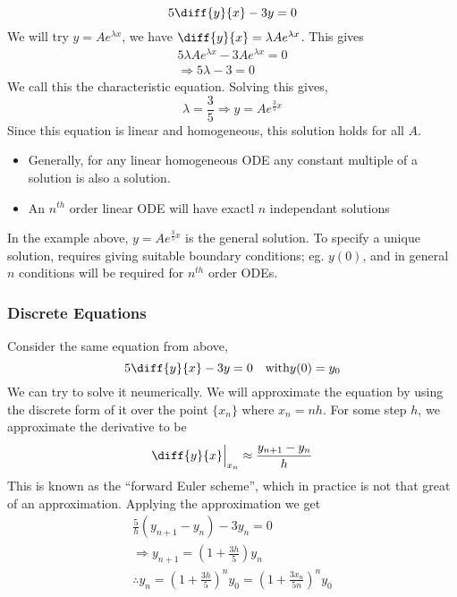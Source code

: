 \documentclass{article}
\begin{document}
\begin{eg}
    \[
        5 \diff{y}{x} - 3y = 0  
    \]
    We will try $y = Ae^{\lambda x}$, we have $\diff{y}{x} = \lambda A e^{\lambda x}$. This gives
    \begin{align*}
        5\lambda A e^{\lambda x} - 3Ae^{\lambda x} = 0 \\
        \Rightarrow 5\lambda - 3 = 0
    \end{align*}
    We call this the characteristic equation. Solving this gives,
    \[
        \lambda = \frac{3}{5} \Rightarrow y = Ae^{\frac{3}{5} x}   
    \]
    Since this equation is linear and homogeneous, this solution holds for all $A$.
\end{eg}

\begin{remark}\leavevmode
    \begin{itemize}
        \item Generally, for any linear homogeneous ODE any constant multiple of a solution is also a solution.
        \item An $n^{th}$ order linear ODE will have exactl $n$ independant solutions
    \end{itemize}
    In the example above, $y = Ae^{\frac{3}{5} x}$ is the general solution. To specify a unique solution, requires giving suitable boundary conditions; eg. $y(0)$, and in general $n$ conditions will be required for $n^{th}$ order ODEs.
\end{remark}

\subsubsection*{Discrete Equations}

Consider the same equation from above,
\[
    5 \diff{y}{x} - 3y = 0 \quad \text{with} y(0) = y_0
\]
We can try to solve it neumerically. We will approximate the equation by using the discrete form of it over the point $\{x_n\}$ where $x_n = nh$. For some step $h$, we approximate the derivative to be
\[
    \diff{y}{x}\Big{|}_{x_n} \approx \frac{y_{n+1} - y_n}{h}    
\]
This is known as the ``forward Euler scheme'', which in practice is not that great of an approximation. Applying the approximation we get
\begin{align*}
    \frac{5}{h}(y_{n+1} - y_n) - 3y_n = 0 \\
    \Rightarrow y_{n+1} = (1 + \frac{3h}{5})y_{n} \\
    \therefore y_n = (1 + \frac{3h}{5})^ny_0 = (1 + \frac{3x_n}{5n})^ny_0 \tag{$x_n = nh$}
\end{align*}
\end{document}
